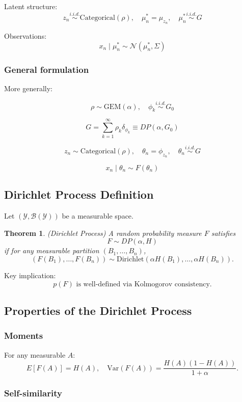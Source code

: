 \documentclass[12pt,oneside]{book}
\numberwithin{equation}{section}
\theoremstyle{definition}
\theoremstyle{plain}
\newtheorem{theorem}{Theorem}[section]
\theoremstyle{remark}
\begin{document}
Latent structure:
\[
z_n \overset{i.i.d.}{\sim} \mathrm{Categorical}(\rho),
\quad
\mu_n^* = \mu_{z_n},
\quad
\mu_n^* \overset{i.i.d.}{\sim} G
\]

Observations:
\[
x_n \mid \mu_n^* \sim \mathcal{N}(\mu_n^*, \Sigma)
\]

\subsubsection*{General formulation}

More generally:

\[
\rho \sim \mathrm{GEM}(\alpha),
\quad
\phi_k \overset{i.i.d.}{\sim} G_0
\]

\[
G = \sum_{k=1}^{\infty} \rho_k \delta_{\phi_k} \equiv DP(\alpha, G_0)
\]

\[
z_n \sim \mathrm{Categorical}(\rho),
\quad
\theta_n = \phi_{z_n},
\quad
\theta_n \overset{i.i.d.}{\sim} G
\]

\[
x_n \mid \theta_n \sim F(\theta_n)
\]

\subsection*{Dirichlet Process Definition}

Let $(\mathcal{Y}, \mathcal{B}(\mathcal{Y}))$ be a measurable space.

\begin{theorem}(Dirichlet Process)
A random probability measure $F$ satisfies
\[
F \sim DP(\alpha, H)
\]
if for any measurable partition $(B_1,\dots,B_n)$,
\[
(F(B_1),\dots,F(B_n)) \sim \mathrm{Dirichlet}(\alpha H(B_1),\dots,\alpha H(B_n)).
\]
\end{theorem}

Key implication:
\[
p(F) \text{ is well-defined via Kolmogorov consistency.}
\]

\subsection*{Properties of the Dirichlet Process}

\subsubsection*{Moments}

For any measurable $A$:
\[
E[F(A)] = H(A),
\quad
\mathrm{Var}(F(A)) = \frac{H(A)(1-H(A))}{1+\alpha}.
\]

\subsubsection*{Self-similarity}
\end{document}
